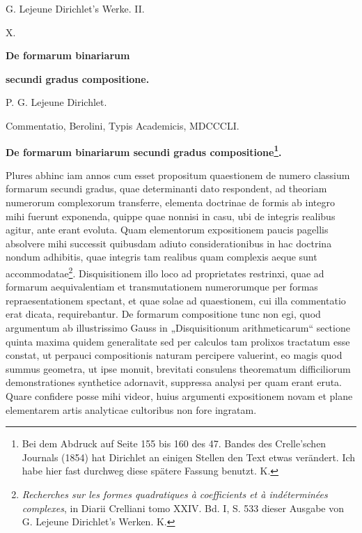 \documentclass[11pt]{article}
\begin{document}
\begin{center}
{\Large G. Lejeune Dirichlet's Werke. II.}\par\vspace{1.2em}
{\Large X.}\par\vspace{0.5em}
{\LARGE \textbf{De formarum binariarum}}\par
{\LARGE \textbf{secundi gradus compositione.}}\par\vspace{1em}
{\large P. G. Lejeune Dirichlet.}\par\vspace{0.5em}
{\small Commentatio, Berolini, Typis Academicis, MDCCCLI.}
\end{center}

\begin{center}
{\large \textbf{De formarum binariarum secundi gradus compositione\footnote{Bei dem Abdruck auf Seite 155 bis 160 des 47. Bandes des Crelle'schen Journals (1854) hat Dirichlet an einigen Stellen den Text etwas verändert. Ich habe hier fast durchweg diese spätere Fassung benutzt. K.}.}}
\end{center}

Plures abhinc iam annos cum esset propositum quaestionem de numero classium formarum secundi gradus, quae determinanti dato respondent, ad theoriam numerorum complexorum transferre, elementa doctrinae de formis ab integro mihi fuerunt exponenda, quippe quae nonnisi in casu, ubi de integris realibus agitur, ante erant evoluta. Quam elementorum expositionem paucis pagellis absolvere mihi successit quibusdam adiuto considerationibus in hac doctrina nondum adhibitis, quae integris tam realibus quam complexis aeque sunt accommodatae\footnote{\emph{Recherches sur les formes quadratiques à coefficients et à indéterminées complexes}, in Diarii Crelliani tomo XXIV. Bd. I, S. 533 dieser Ausgabe von G. Lejeune Dirichlet's Werken. K.}. Disquisitionem illo loco ad proprietates restrinxi, quae ad formarum aequivalentiam et transmutationem numerorumque per formas repraesentationem spectant, et quae solae ad quaestionem, cui illa commentatio erat dicata, requirebantur. De formarum compositione tunc non egi, quod argumentum ab illustrissimo Gauss in „Disquisitionum arithmeticarum“ sectione quinta maxima quidem generalitate sed per calculos tam prolixos tractatum esse constat, ut perpauci compositionis naturam percipere valuerint, eo magis quod summus geometra, ut ipse monuit, brevitati consulens theorematum difficiliorum demonstrationes synthetice adornavit, suppressa analysi per quam erant eruta. Quare confidere posse mihi videor, huius argumenti expositionem novam et plane elementarem artis analyticae cultoribus non fore ingratam.
\end{document}
